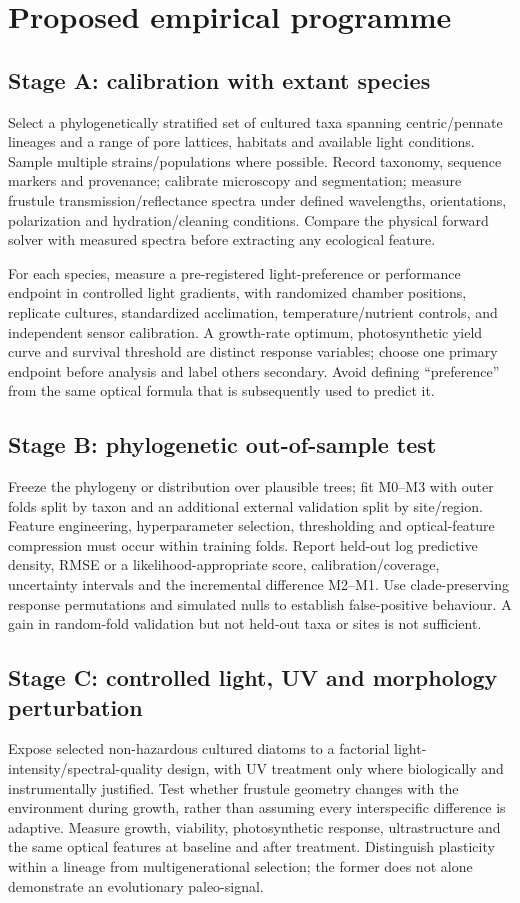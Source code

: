 \documentclass[11pt,a4paper]{article}
\begin{document}
\section{Proposed empirical programme}
\subsection{Stage A: calibration with extant species}
Select a phylogenetically stratified set of cultured taxa spanning centric/pennate lineages and a range of pore lattices, habitats and available light conditions. Sample multiple strains/populations where possible. Record taxonomy, sequence markers and provenance; calibrate microscopy and segmentation; measure frustule transmission/reflectance spectra under defined wavelengths, orientations, polarization and hydration/cleaning conditions. Compare the physical forward solver with measured spectra before extracting any ecological feature.

For each species, measure a pre-registered light-preference or performance endpoint in controlled light gradients, with randomized chamber positions, replicate cultures, standardized acclimation, temperature/nutrient controls, and independent sensor calibration. A growth-rate optimum, photosynthetic yield curve and survival threshold are distinct response variables; choose one primary endpoint before analysis and label others secondary. Avoid defining ``preference'' from the same optical formula that is subsequently used to predict it.

\subsection{Stage B: phylogenetic out-of-sample test}
Freeze the phylogeny or distribution over plausible trees; fit M0--M3 with outer folds split by taxon and an additional external validation split by site/region. Feature engineering, hyperparameter selection, thresholding and optical-feature compression must occur within training folds. Report held-out log predictive density, RMSE or a likelihood-appropriate score, calibration/coverage, uncertainty intervals and the incremental difference M2--M1. Use clade-preserving response permutations and simulated nulls to establish false-positive behaviour. A gain in random-fold validation but not held-out taxa or sites is not sufficient.

\subsection{Stage C: controlled light, UV and morphology perturbation}
Expose selected non-hazardous cultured diatoms to a factorial light-intensity/spectral-quality design, with UV treatment only where biologically and instrumentally justified. Test whether frustule geometry changes with the environment during growth, rather than assuming every interspecific difference is adaptive. Measure growth, viability, photosynthetic response, ultrastructure and the same optical features at baseline and after treatment. Distinguish plasticity within a lineage from multigenerational selection; the former does not alone demonstrate an evolutionary paleo-signal.
\end{document}
